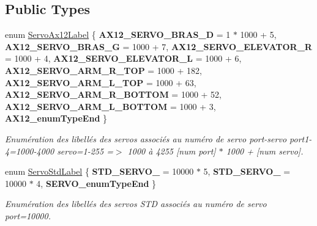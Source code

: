 \subsection*{Public Types}
\begin{DoxyCompactItemize}
\item 
\mbox{\label{classOPOS6UL__ActionsExtended_a520f3d4a043384a6fd7060632f2962eb}} 
enum \hyperlink{classOPOS6UL__ActionsExtended_a520f3d4a043384a6fd7060632f2962eb}{Servo\+Ax12\+Label} \{ \newline
{\bfseries A\+X12\+\_\+\+S\+E\+R\+V\+O\+\_\+\+B\+R\+A\+S\+\_\+D} = 1 $\ast$ 1000 + 5, 
{\bfseries A\+X12\+\_\+\+S\+E\+R\+V\+O\+\_\+\+B\+R\+A\+S\+\_\+G} = 1000 + 7, 
{\bfseries A\+X12\+\_\+\+S\+E\+R\+V\+O\+\_\+\+E\+L\+E\+V\+A\+T\+O\+R\+\_\+R} = 1000 + 4, 
{\bfseries A\+X12\+\_\+\+S\+E\+R\+V\+O\+\_\+\+E\+L\+E\+V\+A\+T\+O\+R\+\_\+L} = 1000 + 6, 
\newline
{\bfseries A\+X12\+\_\+\+S\+E\+R\+V\+O\+\_\+\+A\+R\+M\+\_\+\+R\+\_\+\+T\+OP} = 1000 + 182, 
{\bfseries A\+X12\+\_\+\+S\+E\+R\+V\+O\+\_\+\+A\+R\+M\+\_\+\+L\+\_\+\+T\+OP} = 1000 + 63, 
{\bfseries A\+X12\+\_\+\+S\+E\+R\+V\+O\+\_\+\+A\+R\+M\+\_\+\+R\+\_\+\+B\+O\+T\+T\+OM} = 1000 + 52, 
{\bfseries A\+X12\+\_\+\+S\+E\+R\+V\+O\+\_\+\+A\+R\+M\+\_\+\+L\+\_\+\+B\+O\+T\+T\+OM} = 1000 + 3, 
\newline
{\bfseries A\+X12\+\_\+enum\+Type\+End}
 \}\begin{DoxyCompactList}\small\item\em Enumération des libellés des servos associés au numéro de servo port-\/servo port1-\/4=1000-\/4000 servo=1-\/255 =$>$ 1000 à 4255 \mbox{[}num port\mbox{]} $\ast$ 1000 + \mbox{[}num servo\mbox{]}. \end{DoxyCompactList}
\item 
\mbox{\label{classOPOS6UL__ActionsExtended_a53a3ad386f5cfb5aa24c13430d490718}} 
enum \hyperlink{classOPOS6UL__ActionsExtended_a53a3ad386f5cfb5aa24c13430d490718}{Servo\+Std\+Label} \{ {\bfseries S\+T\+D\+\_\+\+S\+E\+R\+V\+O\+\_} = 10000 $\ast$ 5, 
{\bfseries S\+T\+D\+\_\+\+S\+E\+R\+V\+O\+\_} = 10000 $\ast$ 4, 
{\bfseries S\+E\+R\+V\+O\+\_\+enum\+Type\+End}
 \}\begin{DoxyCompactList}\small\item\em Enumération des libellés des servos S\+TD associés au numéro de servo port=10000. \end{DoxyCompactList}
\end{DoxyCompactItemize}
